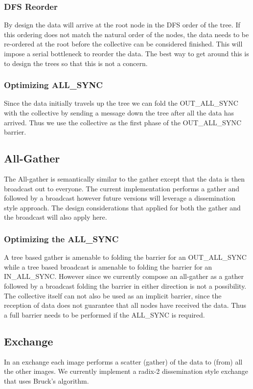 \documentclass[times,10pt]{article}
\begin{document}
\subsubsection{DFS Reorder}
By design the data will arrive at the root node in the DFS order of the tree. If this ordering does not match the natural order of the nodes, the data needs to be re-ordered at the root before the collective can be considered finished. This will impose a serial bottleneck to reorder the data. The best way to get around this is to design the trees so that this is not a concern. 

\subsubsection{Optimizing ALL\_SYNC}
Since the data initially travels up the tree we can fold the OUT\_ALL\_SYNC with the collective by sending a message down the tree after all the data has arrived. Thus we use the collective as the first phase of the OUT\_ALL\_SYNC barrier. 

\subsection{All-Gather}
The All-gather is semantically similar to the gather except that the data is then broadcast out to everyone. The current implementation performs a gather and followed by a broadcast however future versions will leverage a dissemination style approach. The design considerations that applied for both the gather and the broadcast will also apply here. 

\subsubsection{Optimizing the ALL\_SYNC}
A tree based gather is amenable to folding the barrier for an OUT\_ALL\_SYNC while a tree based broadcast is amenable to folding the barrier for an IN\_ALL\_SYNC. However since we currently compose an all-gather as a gather followed by a broadcast folding the barrier in either direction is not a possibility. The collective itself can not also be used as an implicit barrier, since the reception of data does not guarantee that all nodes have received the data. Thus a full barrier needs to be performed if the ALL\_SYNC is required. 

\subsection{Exchange}
In an exchange each image performs a scatter (gather) of the data to (from) all the other images. We currently implement a radix-2 dissemination style exchange that uses Bruck's algorithm. 
\end{document}
